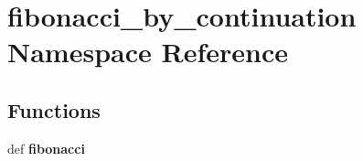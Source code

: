 \section{fibonacci\_\-by\_\-continuation Namespace Reference}
\label{namespacefibonacci__by__continuation}


\subsection*{Functions}
\begin{CompactItemize}
\item 
def {\bf fibonacci}\label{namespacefibonacci__by__continuation_3030e061a5154666af815f5bc1f0d347}

\end{CompactItemize}
